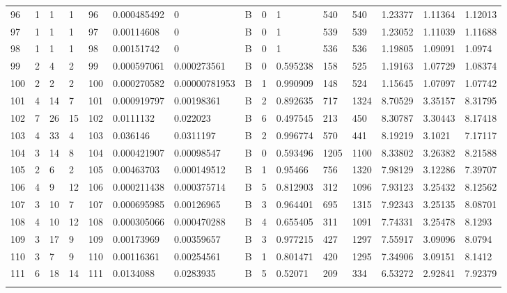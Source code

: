 \begin{latin}
\begin{longtable}{lllllllllllllll}
	96  & 1  & 1   & 1  & 96  & 0.000485492    & 0              & B & 0  & 1        & 540  & 540  & 1.23377 & 1.11364 & 1.12013 \\
	97  & 1  & 1   & 1  & 97  & 0.00114608     & 0              & B & 0  & 1        & 539  & 539  & 1.23052 & 1.11039 & 1.11688 \\
	98  & 1  & 1   & 1  & 98  & 0.00151742     & 0              & B & 0  & 1        & 536  & 536  & 1.19805 & 1.09091 & 1.0974  \\
	99  & 2  & 4   & 2  & 99  & 0.000597061    & 0.000273561    & B & 0  & 0.595238 & 158  & 525  & 1.19163 & 1.07729 & 1.08374 \\
	100 & 2  & 2   & 2  & 100 & 0.000270582    & 0.00000781953  & B & 1  & 0.990909 & 148  & 524  & 1.15645 & 1.07097 & 1.07742 \\
	101 & 4  & 14  & 7  & 101 & 0.000919797    & 0.00198361     & B & 2  & 0.892635 & 717  & 1324 & 8.70529 & 3.35157 & 8.31795 \\
	102 & 7  & 26  & 15 & 102 & 0.0111132      & 0.022023       & B & 6  & 0.497545 & 213  & 450  & 8.30787 & 3.30443 & 8.17418 \\
	103 & 4  & 33  & 4  & 103 & 0.036146       & 0.0311197      & B & 2  & 0.996774 & 570  & 441  & 8.19219 & 3.1021  & 7.17117 \\
	104 & 3  & 14  & 8  & 104 & 0.000421907    & 0.00098547     & B & 0  & 0.593496 & 1205 & 1100 & 8.33802 & 3.26382 & 8.21588 \\
	105 & 2  & 6   & 2  & 105 & 0.00463703     & 0.000149512    & B & 1  & 0.95466  & 756  & 1320 & 7.98129 & 3.12286 & 7.39707 \\
	106 & 4  & 9   & 12 & 106 & 0.000211438    & 0.000375714    & B & 5  & 0.812903 & 312  & 1096 & 7.93123 & 3.25432 & 8.12562 \\
	107 & 3  & 10  & 7  & 107 & 0.000695985    & 0.00126965     & B & 3  & 0.964401 & 695  & 1315 & 7.92343 & 3.25135 & 8.08701
	\begin{comment} \\
	108 & 4  & 10  & 12 & 108 & 0.000305066    & 0.000470288    & B & 4  & 0.655405 & 311  & 1091 & 7.74331 & 3.25478 & 8.1293  \\
	109 & 3  & 17  & 9  & 109 & 0.00173969     & 0.00359657     & B & 3  & 0.977215 & 427  & 1297 & 7.55917 & 3.09096 & 8.0794  \\
	110 & 3  & 7   & 9  & 110 & 0.00116361     & 0.00254561     & B & 1  & 0.801471 & 420  & 1295 & 7.34906 & 3.09151 & 8.1412  \\
	111 & 6  & 18  & 14 & 111 & 0.0134088      & 0.0283935      & B & 5  & 0.52071  & 209  & 334  & 6.53272 & 2.92841 & 7.92379 \\

\end{comment}
\end{longtable}
\end{latin}
